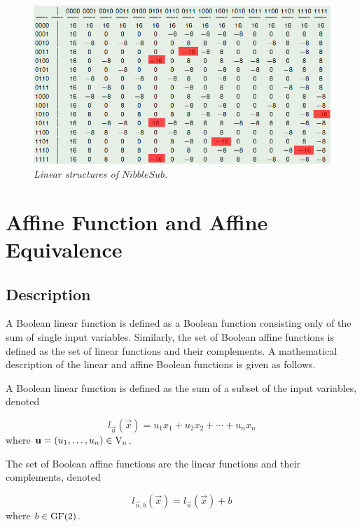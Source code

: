 \begin{example}
\begin{figure}[htbp!]
\centering
\includegraphics[width=\textwidth]{ls}
\caption[Linear structures of NibbleSub]{\textit{Linear structures of }$NibbleSub$.}
\label{fig:ls}
\end{figure}

\end{example}

\section{Affine Function and Affine Equivalence}
\label{sec:AF}

\subsection{Description}

A Boolean linear function is defined as a Boolean function consisting only of the sum of single input variables. Similarly, the set of Boolean affine functions is defined as the set of linear functions and their complements. A mathematical description of the linear and affine Boolean functions is given as follows.

\begin{definition}
A Boolean linear function is defined as the sum of a subset of the input variables, denoted

\begin{equation}
l_{\vec{u}}(\vec{x})=u_1x_1+u_2x_2+ \cdots + u_nx_n
\end{equation}
where $\vec{u} = (u_1, \ldots, u_n) \in \gf{V_n}$.
\end{definition}

\begin{definition}
The set of Boolean affine functions are the linear functions and their complements, denoted

\begin{equation}
l_{\vec{u},b}(\vec{x})=l_{\vec{u}}(\vec{x})+b
\end{equation}
where $b \in \gf{GF(2)}$.
\end{definition}


